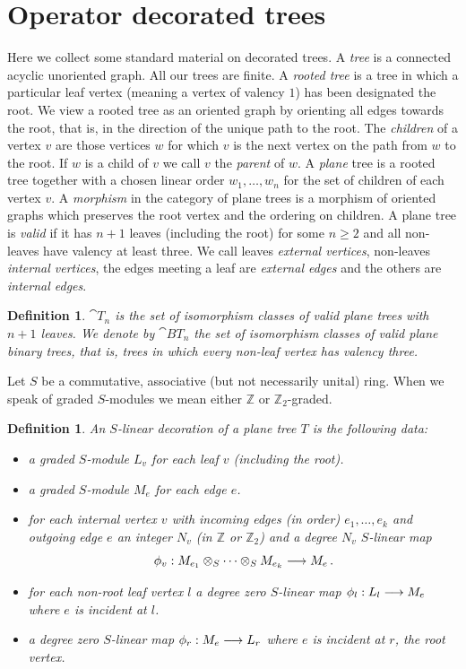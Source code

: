 \documentclass[english,letter paper,12pt,leqno]{article}
\theoremstyle{example}
\newtheorem{definition}[theorem]{Definition}
\numberwithin{equation}{section}
\def\nZ{\mathds{Z}}
\begin{document}
\section{Operator decorated trees}\label{section:trees}

Here we collect some standard material on decorated trees. A \emph{tree} is a connected acyclic unoriented graph. All our trees are finite. A \emph{rooted tree} is a tree in which a particular leaf vertex (meaning a vertex of valency $1$) has been designated the root. We view a rooted tree as an oriented graph by orienting all edges towards the root, that is, in the direction of the unique path to the root. The \emph{children} of a vertex $v$ are those vertices $w$ for which $v$ is the next vertex on the path from $w$ to the root. If $w$ is a child of $v$ we call $v$ the \emph{parent} of $w$. A \emph{plane} tree is a rooted tree together with a chosen linear order $w_1,\ldots,w_n$ for the set of children of each vertex $v$. A \emph{morphism} in the category of plane trees is a morphism of oriented graphs which preserves the root vertex and the ordering on children. A plane tree is \emph{valid} if it has $n + 1$ leaves (including the root) for some $n \ge 2$ and all non-leaves have valency at least three. We call leaves \emph{external vertices}, non-leaves \emph{internal vertices}, the edges meeting a leaf are \emph{external edges} and the others are \emph{internal edges}.

\begin{definition} $\cat{T}_n$ is the set of isomorphism classes of valid plane trees with $n + 1$ leaves. We denote by $\cat{BT}_n$ the set of isomorphism classes of valid plane \emph{binary} trees, that is, trees in which every non-leaf vertex has valency three.
\end{definition}

Let $S$ be a commutative, associative (but not necessarily unital) ring. When we speak of graded $S$-modules we mean either $\nZ$ or $\nZ_2$-graded.

\begin{definition} An $S$-linear \emph{decoration} of a plane tree $T$ is the following data:
\begin{itemize}
\item a graded $S$-module $L_v$ for each leaf $v$ (including the root).
\item a graded $S$-module $M_e$ for each edge $e$.
\item for each internal vertex $v$ with incoming edges (in order) $e_1,\ldots,e_k$ and outgoing edge $e$ an integer $N_v$ (in $\nZ$ or $\nZ_2$) and a degree $N_v$ $S$-linear map
\[
\phi_v: M_{e_1} \otimes_S \cdots \otimes_S M_{e_k} \longrightarrow M_e\,.
\]
\item for each non-root leaf vertex $l$ a degree zero $S$-linear map $\phi_l: L_l \longrightarrow M_e$ where $e$ is incident at $l$.
\item a degree zero $S$-linear map $\phi_r: M_e \longrightarrow L_r$ where $e$ is incident at $r$, the root vertex.
\end{itemize}
\end{definition}
\end{document}
